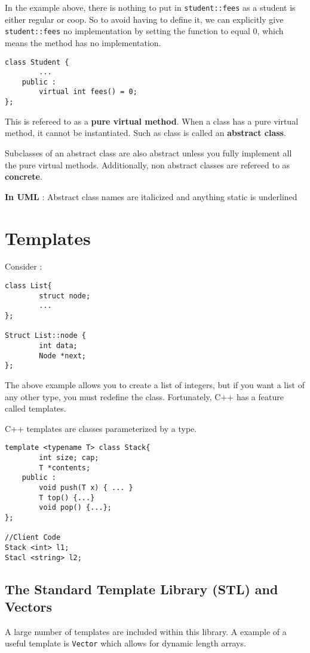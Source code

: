 \documentclass{article}
\begin{document}
In the example above, there is nothing to put in \verb|student::fees| as a student is either regular or coop. So to avoid having to define it, we can explicitly give \verb|student::fees| no implementation by setting the function to equal 0, which means the method has no implementation.

\begin{lstlisting}
class Student {
		...
	public :
		virtual int fees() = 0;
};
\end{lstlisting} 

This is refereed to as a \textbf{pure virtual method}. When a class has a pure virtual method, it cannot be instantiated. Such as class is called an \textbf{abstract class}. 

Subclasses of an abstract class are also abstract unless you fully implement all the pure virtual methods. Additionally, non abstract classes are refereed to as \textbf{concrete}.

\textbf{In UML} : Abstract class names are italicized and anything static is underlined

\section{Templates}
Consider :
\begin{lstlisting}
class List{
		struct node;
		...
};

Struct List::node {
		int data;
		Node *next;
};
\end{lstlisting}

The above example allows you to create a list of integers, but if you want a list of any other type, you must redefine the class. Fortunately, C++ has a feature called templates.

C++ templates are classes parameterized by a type. 

\begin{lstlisting}
template <typename T> class Stack{
		int size; cap;
		T *contents;
	public :
		void push(T x) { ... }
		T top() {...}
		void pop() {...};
};

//Client Code 
Stack <int> l1;
Stacl <string> l2;
\end{lstlisting}

\subsection{The Standard Template Library (STL) and Vectors}

A large number of templates are included within this library. A example of a useful template is \verb|Vector| which allows for dynamic length arrays. 
\end{document}
